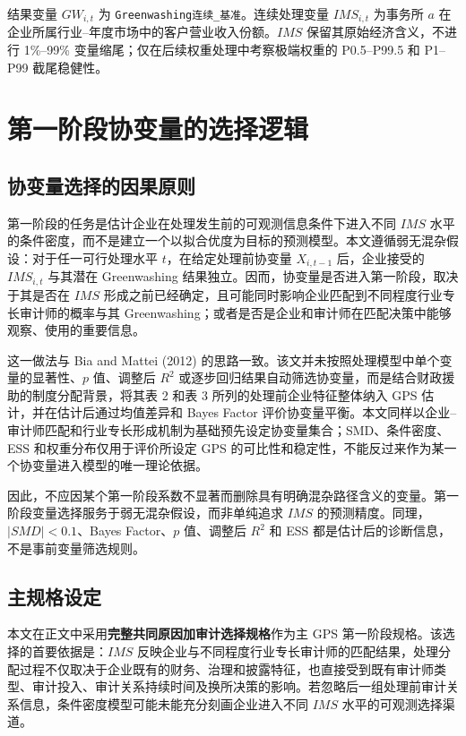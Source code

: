 \documentclass[11pt]{article}
\begin{document}
结果变量 $GW_{i,t}$ 为 \texttt{Greenwashing连续\_基准}。连续处理变量 $IMS_{i,t}$ 为事务所 $a$ 在企业所属行业--年度市场中的客户营业收入份额。$IMS$ 保留其原始经济含义，不进行 1\%--99\% 变量缩尾；仅在后续权重处理中考察极端权重的 P0.5--P99.5 和 P1--P99 截尾稳健性。

\section{第一阶段协变量的选择逻辑}

\subsection{协变量选择的因果原则}

第一阶段的任务是估计企业在处理发生前的可观测信息条件下进入不同 $IMS$ 水平的条件密度，而不是建立一个以拟合优度为目标的预测模型。本文遵循弱无混杂假设：对于任一可行处理水平 $t$，在给定处理前协变量 $X_{i,t-1}$ 后，企业接受的 $IMS_{i,t}$ 与其潜在 Greenwashing 结果独立。因而，协变量是否进入第一阶段，取决于其是否在 $IMS$ 形成之前已经确定，且可能同时影响企业匹配到不同程度行业专长审计师的概率与其 Greenwashing；或者是否是企业和审计师在匹配决策中能够观察、使用的重要信息。

这一做法与 Bia and Mattei (2012) 的思路一致。该文并未按照处理模型中单个变量的显著性、$p$ 值、调整后 $R^2$ 或逐步回归结果自动筛选协变量，而是结合财政援助的制度分配背景，将其表 2 和表 3 所列的处理前企业特征整体纳入 GPS 估计，并在估计后通过均值差异和 Bayes Factor 评价协变量平衡。本文同样以企业--审计师匹配和行业专长形成机制为基础预先设定协变量集合；SMD、条件密度、ESS 和权重分布仅用于评价所设定 GPS 的可比性和稳定性，不能反过来作为某一个协变量进入模型的唯一理论依据。

因此，不应因某个第一阶段系数不显著而删除具有明确混杂路径含义的变量。第一阶段变量选择服务于弱无混杂假设，而非单纯追求 $IMS$ 的预测精度。同理，$|SMD|<0.1$、Bayes Factor、$p$ 值、调整后 $R^2$ 和 ESS 都是估计后的诊断信息，不是事前变量筛选规则。

\subsection{主规格设定}

本文在正文中采用\textbf{完整共同原因加审计选择规格}作为主 GPS 第一阶段规格。该选择的首要依据是：$IMS$ 反映企业与不同程度行业专长审计师的匹配结果，处理分配过程不仅取决于企业既有的财务、治理和披露特征，也直接受到既有审计师类型、审计投入、审计关系持续时间及换所决策的影响。若忽略后一组处理前审计关系信息，条件密度模型可能未能充分刻画企业进入不同 $IMS$ 水平的可观测选择渠道。
\end{document}
